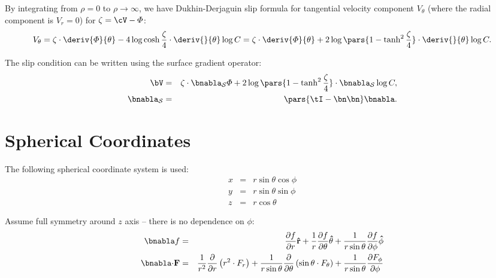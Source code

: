 By integrating from $\rho = 0$ to $\rho \rightarrow \infty$, 
we have Dukhin-Derjaguin slip formula for tangential velocity component $V_\theta$ 
(where the radial component is $V_r = 0$) for $\zeta = \cV - \varPhi$:
\begin{eqnarray} 
V_\theta = \zeta \cdot \deriv{\varPhi}{\theta} -
      4\log\cosh \frac{\zeta}{4} \cdot \deriv{}{\theta} \log C 
= \zeta \cdot \deriv{\varPhi}{\theta} + 
      2\log\pars{1 - \tanh^2 \frac{\zeta}{4}} \cdot \deriv{}{\theta} \log C .
\end{eqnarray}

The slip condition can be written using the surface gradient operator:
\begin{eqnarray*}
\bV &=& 
\zeta \cdot \bnabla_\mathcal{S} \varPhi 
+ 2\log\pars{1-\tanh^2\frac{\zeta}{4}} \cdot \bnabla_\mathcal{S} \log C, \\
\bnabla_\mathcal{S} &=& \pars{\tI - \bn\bn} \bnabla.
\end{eqnarray*}

\section{Spherical Coordinates} \label{append:spherical}

The following spherical coordinate system is used:
\begin{eqnarray}
x &=& r \sin \theta \cos \phi \\
y &=& r \sin \theta \sin \phi \\
z &=& r \cos \theta
\end{eqnarray}

Assume full symmetry around $z$ axis -- there is no dependence on $\phi$:
\begin{eqnarray}
\bnabla f &=& \frac{\partial f}{\partial r} \mathbf{\hat{r}} +
\frac{1}{r} \frac{\partial f}{\partial \theta} \mathbf{\hat{\theta}} +
\frac{1}{r \sin\theta} \frac{\partial f}{\partial \phi} \mathbf{\hat{\phi}}
\\
\bnabla \mathbf{\cdot} \mathbf{F} &=& 
\frac{1}{r^2}\frac{\partial}{\partial r} \left( r^2 \cdot F_r\right)
  + \frac{1}{r \sin\theta} \frac{\partial}{\partial \theta} \left( \sin\theta \cdot F_\theta\right)
  + \frac{1}{r \sin\theta} \frac{\partial F_\phi}{\partial \phi}
\end{eqnarray}

